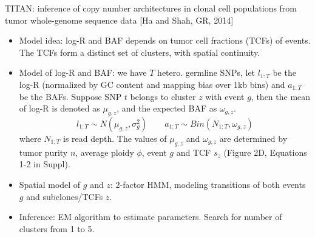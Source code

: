 \documentclass{report}
\begin{document}
TITAN: inference of copy number architectures in clonal cell populations from tumor whole-genome sequence data [Ha and Shah, GR, 2014]
\begin{itemize}
	
	\item Model idea: log-R and BAF depends on tumor cell fractions (TCFs) of events. The TCFs form a distinct set of clusters, with spatial continuity. 
	
	\item Model of log-R and BAF: we have $T$ hetero. germline SNPs, let $l_{1:T}$ be the log-R (normalized by GC content and mapping bias over 1kb bins) and $a_{1:T}$ be the BAFs. Suppose SNP $t$ belongs to cluster $z$ with event $g$, then the mean of log-R is denoted as $\mu_{g,z}$, and the expected BAF as $\omega_{g,z}$. 
	\begin{equation}
	l_{1:T} \sim N(\mu_{g,z}, \sigma_g^2) \qquad a_{1:T} \sim Bin(N_{1:T}, \omega_{g,z})
	\end{equation}
	where $N_{1:T}$ is read depth. The values of $\mu_{g,z}$ and $\omega_{g,z}$ are determined by tumor purity $n$, average ploidy $\phi$, event $g$ and TCF $s_z$ (Figure 2D, Equations 1-2 in Suppl).  
	
	\item Spatial model of $g$ and $z$: 2-factor HMM, modeling transitions of both events $g$ and subclones/TCFs $z$.
	
	\item Inference: EM algorithm to estimate parameters. Search for number of clusters from 1 to 5. 
\end{itemize}
\end{document}
